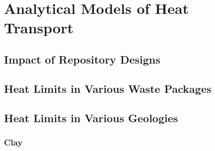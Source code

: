 \section{Analytical Models of Heat Transport} \label{sec:analytical_heat}


\subsection{Impact of Repository Designs}

\subsection{Heat Limits in Various Waste Packages} 




\subsection{Heat Limits in Various Geologies}

\subsubsection{Clay} 
% 

